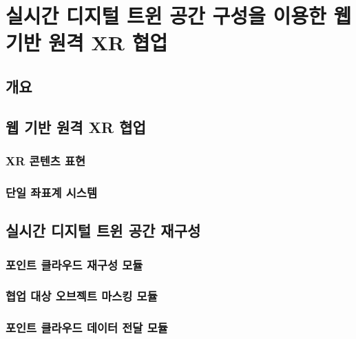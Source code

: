 
\section{실시간 디지털 트윈 공간 구성을 이용한 웹 기반 원격 XR 협업}
\subsection{개요}

\subsection{웹 기반 원격 XR 협업} 
\subsubsection{XR 콘텐츠 표현}
\subsubsection{단일 좌표계 시스템}

\subsection{실시간 디지털 트윈 공간 재구성} 
\subsubsection{포인트 클라우드 재구성 모듈}
\subsubsection{협업 대상 오브젝트 마스킹 모듈}
\subsubsection{포인트 클라우드 데이터 전달 모듈}